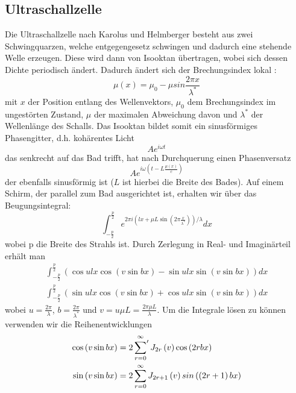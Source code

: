 \subsection{Ultraschallzelle}
Die Ultraschallzelle nach Karolus und Helmberger \cite{Karolus} besteht aus zwei Schwingquarzen, welche entgegengesetz schwingen und dadurch eine stehende Welle erzeugen. Diese wird dann von Isooktan übertragen, wobei sich dessen Dichte periodisch ändert. Dadurch ändert sich der Brechungsindex lokal \cite{Raman}: 
\begin{equation}
 \mu \left( x \right) = \mu_0 - \mu sin \frac{2 \pi x}{ \lambda^*}
\end{equation}
mit $x$ der Position entlang des Wellenvektors, $\mu_0$ dem Brechungsindex im ungestörten Zustand, $\mu$ der maximalen Abweichung davon und $\lambda^*$ der Wellenlänge des Schalls. Das Isooktan bildet somit ein sinusförmiges Phasengitter, d.h. kohärentes Licht
\begin{equation}
 A e^{i \omega t}
\end{equation}
das senkrecht auf das Bad trifft, hat nach Durchquerung einen Phasenversatz
\begin{equation}
 A e^{i \omega \left( t - L \frac{\mu \left( x \right)}{c} \right)}
\end{equation}
der ebenfalls sinusförmig ist ($L$ ist hierbei die Breite des Bades). 
Auf einem Schirm, der parallel zum Bad ausgerichtet ist, erhalten wir über das Beugungsintegral:
\begin{equation}
 \int_{-\frac{p}{2}}^{\frac{p}{2}} e^{2 \pi i \left( l x + \mu L \sin \left( 2 \pi \frac{x}{\lambda^*} \right) \right) / \lambda } dx
\end{equation}
wobei p die Breite des Strahls ist. Durch Zerlegung in Real- und Imaginärteil erhält man
\begin{align}
 \int_{-\frac{p}{2}}^{\frac{p}{2}} \left( \cos ulx \cos \left( v \sin bx \right) - \sin ulx \sin \left( v \sin bx \right) \right) dx \\
\int_{-\frac{p}{2}}^{\frac{p}{2}} \left( \sin ulx \cos \left( v \sin bx \right) + \cos ulx \sin \left( v \sin bx \right) \right) dx
\end{align}
wobei $u = \frac{2 \pi}{\lambda}$, $b = \frac{2 \pi}{\lambda^*}$ und $v= u \mu L = \frac{2 \pi \mu L}{\lambda}$.
Um die Integrale lösen zu können verwenden wir die Reihenentwicklungen
\begin{align}
 \cos \left( v \sin bx \right) & =  2 \sideset{}{'} \sum_{r=0}^{\infty} J_{2r} \left( v \right) \cos \left( 2rbx \right) \\
 \sin \left( v \sin bx \right) & =  2 \sum_{r=0}^{\infty} J_{2r+1} \left( v \right) sin \left( \left( 2r+1 \right) bx \right)
\end{align}
